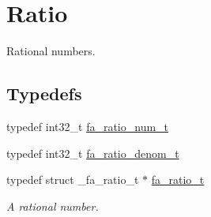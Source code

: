 \hypertarget{group___fa_ratio}{\section{Ratio}
\label{group___fa_ratio}
}


Rational numbers.  


\subsection*{Typedefs}
\begin{DoxyCompactItemize}
\item 
typedef int32\-\_\-t \hyperlink{group___fa_ratio_ga6d6962b946d96535558e341030f16e07}{fa\-\_\-ratio\-\_\-num\-\_\-t}
\item 
typedef int32\-\_\-t \hyperlink{group___fa_ratio_ga18626f0c26ea1666ce0725605044cfa1}{fa\-\_\-ratio\-\_\-denom\-\_\-t}
\item 
typedef struct \-\_\-fa\-\_\-ratio\-\_\-t $\ast$ \hyperlink{group___fa_ratio_gaf3b37b5fdfcccb6283b7ac806c72b273}{fa\-\_\-ratio\-\_\-t}
\begin{DoxyCompactList}\small\item\em A rational number. \end{DoxyCompactList}\end{DoxyCompactItemize}

